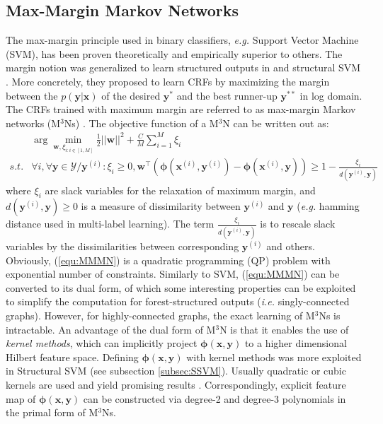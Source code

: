 \subsection{Max-Margin Markov Networks}
\label{subsec:MMMN}
The max-margin principle used in binary classifiers, \emph{e.g.} Support Vector Machine (SVM), has been proven theoretically and empirically \citep{Vapnik} superior to others.        
The margin notion was generalized to learn structured outputs in \cite{Taskar03} and structural SVM \citep{StructSVM}. More concretely, they proposed to learn CRFs by maximizing the margin 
between the $p(\mathbf{y|x})$ of the desired $\mathbf{y^*}$ and the best runner-up $\mathbf{y}^{**}$ in log domain. The CRFs trained with maximum margin are referred to as 
max-margin Markov networks (M$^3$Ns) \citep{Taskar03}.  The objective function of a M$^3$N can be written out as: 
\begin{equation}
    \begin{array}{rl}
        & \arg\min_{\mathbf{w},\xi_{i:i\in[1,M]}}  \frac{1}{2} ||\mathbf{w}||^2 +\frac{C}{M} \sum_{i=1}^M \xi_i \\
		s.t. &\forall i, \forall \mathbf{y}\in\mathcal{Y}/\mathbf{y}^{(i)}: \xi_i\geq0, \mathbf{w}^\top (\boldsymbol{\phi}(\mathbf{x}^{(i)},\mathbf{y}^{(i)})-\boldsymbol{\phi} 
        (\mathbf{x}^{(i)},\mathbf{y}))\geq 1-\frac{\xi_i}{d(\mathbf{y}^{(i)},\mathbf{y})}
    \end{array}
    \label{equ:MMMN}
\end{equation}
where $\xi_i$ are slack variables for the relaxation of 
maximum margin, and $d(\mathbf{y}^{(i)},\mathbf{y})\geq0$ is a measure of dissimilarity between $\mathbf{y}^{(i)}$ and $\mathbf{y}$ 
(\emph{e.g.} hamming distance used in multi-label learning). The term $\frac{\xi_i}{d(\mathbf{y}^{(i)},\mathbf{y})}$ is to rescale 
slack variables by the dissimilarities between corresponding $\mathbf{y}^{(i)}$ and others. 
Obviously, (\ref{equ:MMMN}) is a quadratic programming (QP)  problem with exponential number of 
constraints. Similarly to SVM, (\ref{equ:MMMN}) can be converted to its dual form, of which some interesting properties can be exploited 
to simplify the computation 
for forest-structured outputs (\emph{i.e.} singly-connected graphs). However, for highly-connected graphs, the exact learning of M$^3$Ns is intractable.  
An advantage of the dual form of M$^3$N is that it enables the use of \emph{kernel methods}, which can implicitly project 
$\boldsymbol{\phi}(\mathbf{x},\mathbf{y})$ to 
a higher dimensional Hilbert feature space. Defining $\boldsymbol{\phi}(\mathbf{x},\mathbf{y})$  with kernel methods was more exploited in Structural SVM \citep{StructSVM} (see subsection \ref{subsec:SSVM}). 
Usually quadratic or cubic kernels are used and yield promising results \citep{Taskar03}. 
Correspondingly, 
explicit feature map of $\boldsymbol{\phi}(\mathbf{x},\mathbf{y})$  can be constructed via degree-2 and degree-3 polynomials in the primal form of M$^3$Ns.  

